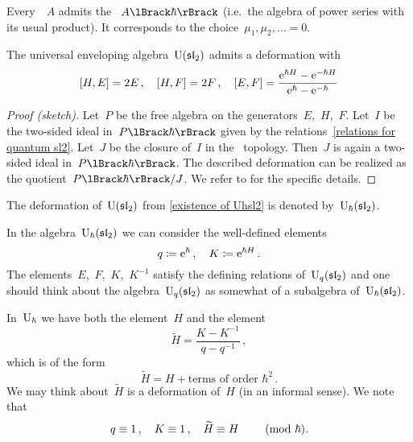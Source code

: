 \documentclass[a4paper, 11pt, oneside]{scrartcl}
\begin{document}
\begin{example}
  Every~\algebra{$\kf$}~$A$ admits the ~$\power{A}{\hbar}$ (i.e.\ the algebra of power series with its usual product).
  It corresponds to the choice~$\mu_1, \mu_2, \dotsc = 0$.
\end{example}

\begin{theorem}
  \label{existence of Uhsl2}
  The universal enveloping algebra~$\operatorname{U}(\mathfrak{sl}_2)$ admits a deformation with
  \begin{equation}
    \label{relations for quantum sl2}
    [H, E] = 2E \,,
    \quad
    [H, F] = 2F \,,
    \quad
    [E, F]
    =
    \frac{ \mathrm{e}^{\hbar H} - \mathrm{e}^{-\hbar H} }{ \mathrm{e}^{\hbar} - \mathrm{e}^{-\hbar} }
  \end{equation}
\end{theorem}

\begin{proof}[Proof (sketch)]
  Let~$P$ be the free algebra on the generators~$E$,~$H$,~$F$.
  Let~$I$ be the two-sided ideal in~$\power{P}{\hbar}$ given by the relations~\eqref{relations for quantum sl2}.
  Let~$J$ be the closure of~$I$ in the~\adic{$\hbar$} topology.
  Then~$J$ is again a two-sided ideal in~$\power{P}{\hbar}$.
  The described deformation can be realized as the quotient~$\power{P}{\hbar} / J$.
  We refer to \cite[Definition-Proposition~6.4.3~ff.]{guide_to_quantum_groups} for the specific details.
\end{proof}

\begin{definition}
  The deformation of~$\operatorname{U}(\mathfrak{sl}_2)$ from \cref{existence of Uhsl2} is denoted by~$\operatorname{U}_{\hbar}(\mathfrak{sl}_2)$.
\end{definition}

\begin{remark}
  In the algebra~$\operatorname{U}_{\hbar}(\mathfrak{sl}_2)$ we can consider the well-defined elements
  \[
    q \coloneqq \mathrm{e}^{\hbar} \,,
    \quad
    K \coloneqq \mathrm{e}^{\hbar H} \,.
  \]
  The elements~$E$,~$F$,~$K$,~$K^{-1}$ satisfy the defining relations of~$\operatorname{U}_q(\mathfrak{sl}_2)$ and one should think about the algebra~$\operatorname{U}_q(\mathfrak{sl}_2)$ as somewhat of a subalgebra of~$\operatorname{U}_{\hbar}(\mathfrak{sl}_2)$.

  In~$\operatorname{U}_{\hbar}$ we have both the element~$H$ and the element
  \[
    \widetilde{H}
    =
    \frac{K - K^{-1}}{q - q^{-1}} \,,
  \]
  which is of the form
  \[
    \widetilde{H}
    =
    H + \text{terms of order~$\hbar^2$} \,.
  \]
  We may think about~$\widetilde{H}$ is a deformation of~$H$ (in an informal sense).
  We note that
  \[
    q \equiv 1 \,,
    \quad
    K \equiv 1 \,,
    \quad
    \widetilde{H} \equiv H
    \qquad
    \ (\mathrm{mod}\ \hbar).
  \]
\end{remark}
\end{document}
